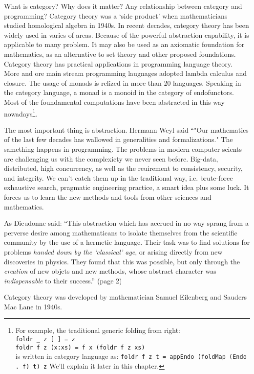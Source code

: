 \documentclass{article}
\begin{document}
What is category? Why does it matter? Any relationship between category and programming? Category theory was a `side product' when mathematicians studied homological algebra in 1940s. In recent decades, category theory has been widely used in varies of areas. Because of the powerful abstraction capability, it is applicable to many problem. It may also be used as an axiomatic foundation for mathematics, as an alternative to set theory and other proposed foundations. Category theory has practical applications in programming language theory. More and ore main stream programming laugnages adopted lambda calculus and closure. The usage of monads is relized in more than 20 languages\cite{Monad-Haskell-Wiki}. Speaking in the category language, a monad is a monoid in the category of endofunctors. Most of the foundamental computations have been abstracted in this way nowadays\footnote{For example, the traditional generic folding from right: \\
\texttt{foldr \_ z {[} {]} = z} \\
\texttt{foldr f z (x:xs) = f x (foldr f z xs)} \\
is written in category language as: \texttt{foldr f z t = appEndo (foldMap (Endo . f) t) z} We'll explain it later in this chapter.}.

The most important thing is abstraction. Hermann Weyl said ``"Our mathematics of the last few decades has wallowed in generalities and formalizations." The samething happens in programming. The problems in modern computer scients are challenging us with the complexicty we never seen before. Big-data, distributed, high concurrency, as well as the reuirement to consistency, security, and integrity. We can't catch them up in the traditional way, i.e. brute-force exhaustive search, pragmatic engineering practice, a smart idea plus some luck. It forces us to learn the new methods and tools from other sciences and mathematics.

As Dieudonne said: ``This abstraction which has accrued in no way sprang from a perverse desire among mathematicans to isolate themselves from the scientific community by the use of a hermetic language. Their task was to find solutions for problems {\em handed down by the `classical' age}, or arising directly from new discoveries in physics. They found that this was possible, but only through the {\em creation} of new objets and new methods, whose abstract character was {\em indispensable} to their success.'' \cite{Dieudonne1987}(page 2)

Category theory was developed by mathematician Samuel Eilenberg and Sauders Mac Lane in 1940s.
\end{document}
